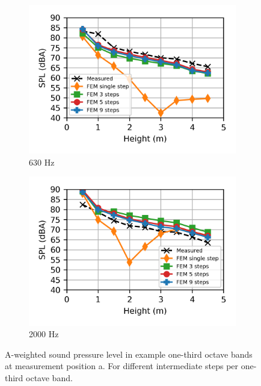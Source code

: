 \begin{figure}[H]
\begin{subfigure}[b]{0.49\textwidth}
		\includegraphics{fig/chap5/freq_steps/third_octave_over_height/630_Hz.png}
		\caption{630 Hz}
	\end{subfigure}
	\hfill
	\begin{subfigure}[b]{0.49\textwidth}
		\centering
		\includegraphics{fig/chap5/freq_steps/third_octave_over_height/2000_Hz.png}
		\caption{2000 Hz}
		\label{fig:curve_sink}
	\end{subfigure}
	
	\caption{A-weighted sound pressure level in example one-third octave bands at measurement position a. For different intermediate steps per one-third octave band.}
	
	\label{fig:third_octave_over_height_freq_steps}
\end{figure}

